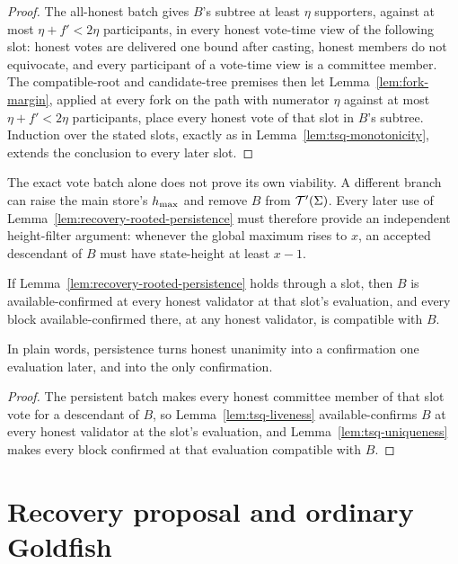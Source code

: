 \begin{proof}
The all-honest batch gives \(B\)'s subtree at least \(\eta\) supporters,
against at most \(\eta+f'<2\eta\) participants, in every honest vote-time view
of the following slot: honest votes are delivered one bound after casting,
honest members do not equivocate, and every participant of a vote-time
view is a committee member.  The compatible-root and candidate-tree
premises then let Lemma~\ref{lem:fork-margin}, applied at every fork on
the path with numerator \(\eta\) against at most \(\eta+f'<2\eta\)
participants, place every honest vote of that slot in \(B\)'s subtree.  Induction over the
stated slots, exactly as in Lemma~\ref{lem:tsq-monotonicity}, extends the
conclusion to every later slot.
\end{proof}

The exact vote batch alone does not prove its own viability.  A different
branch can raise the main store's \(h_{\max}\) and remove \(B\) from
\(\mathcal{T}'(\Sigma)\).  Every later use of
Lemma~\ref{lem:recovery-rooted-persistence} must therefore provide an
independent height-filter argument: whenever the global maximum rises to
\(x\), an accepted descendant of \(B\) must have state-height at least
\(x-1\).

\begin{lemma}
\label{lem:recovery-rooted-confirmation}
If Lemma~\ref{lem:recovery-rooted-persistence} holds through a slot, then
\(B\) is available-confirmed at every honest validator at that slot's
evaluation, and every block available-confirmed there, at any honest
validator, is compatible with \(B\).

In plain words, persistence turns honest unanimity into a confirmation one
evaluation later, and into the only confirmation.
\end{lemma}

\begin{proof}
The persistent batch makes every honest committee member of that slot vote
for a descendant of \(B\), so Lemma~\ref{lem:tsq-liveness} available-confirms
\(B\) at every honest validator at the slot's evaluation, and
Lemma~\ref{lem:tsq-uniqueness} makes every block confirmed at that
evaluation compatible with \(B\).
\end{proof}


\section{Recovery proposal and ordinary Goldfish}\label{sec:recovery-proposals}

